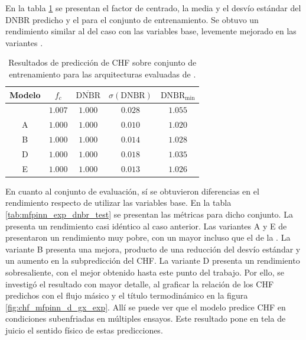 En la tabla \ref{tab:mfpinn_exp_dnbr_train} se presentan el factor de centrado, la media y el desvío estándar del DNBR predicho y el \dnbrmin{} para el conjunto de entrenamiento. Se obtuvo un rendimiento similar al del caso con las variables base, levemente mejorado en las variantes \mfpinn{}.

\begin{table}[H]
	\centering
	\caption{Resultados de predicción de CHF sobre conjunto de entrenamiento para las arquitecturas evaluadas de \mfpinn{}.}
	\begin{tabular}{c c c c c} 
        \toprule
        \textbf{Modelo} & $f_c$ & $\overline{\mathrm{DNBR}}$ & $\sigma(\mathrm{DNBR})$ & $\mathrm{DNBR}_\mathrm{min}$ \\ \hline
        \mfdnn{}    & $1.007$ & $1.000$ & $0.028$ & $1.055$ \\
        \mfpinn{} A & $1.000$ & $1.000$ & $0.010$ & $1.020$ \\
        \mfpinn{} B & $1.000$ & $1.000$ & $0.014$ & $1.028$ \\
        \mfpinn{} D & $1.000$ & $1.000$ & $0.018$ & $1.035$ \\
        \mfpinn{} E & $1.000$ & $1.000$ & $0.013$ & $1.026$ \\
		\bottomrule
	\end{tabular}
	\label{tab:mfpinn_exp_dnbr_train}
\end{table}

En cuanto al conjunto de evaluación, sí se obtuvieron diferencias en el rendimiento respecto de utilizar las variables base. En la tabla \ref{tab:mfpinn_exp_dnbr_test} se presentan las métricas para dicho conjunto. La \mfdnn{} presenta un rendimiento casi idéntico al caso anterior. Las variantes A y E de \mfpinn{} presentaron un rendimiento muy pobre, con un \dnbrmin{} mayor incluso que el de la \lfdnn{}. La variante B presenta una mejora, producto de una reducción del desvío estándar y un aumento en la subpredicción del CHF. 
La variante D presenta un rendimiento sobresaliente, con el mejor \dnbrmin{} obtenido hasta este punto del trabajo. Por ello, se investigó el resultado con mayor detalle, al graficar la relación de los CHF predichos con el flujo másico y el título termodinámico en la figura \ref{fig:chf_mfpinn_d_gx_exp}. Allí se puede ver que el modelo predice CHF en condiciones subenfriadas en múltiples ensayos. Este resultado pone en tela de juicio el sentido físico de estas predicciones.

